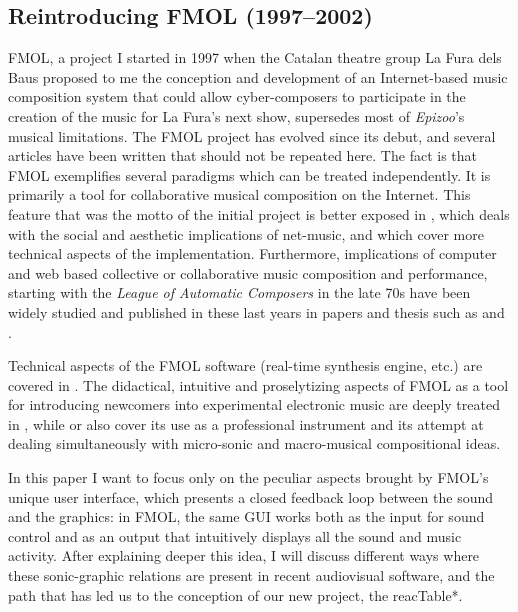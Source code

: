 \subsection{Reintroducing FMOL (1997--2002)}

FMOL, a project I started in 1997  when the Catalan theatre group La Fura dels
Baus proposed to me the conception and development of an Internet-based music 
composition  system that could allow cyber-composers to participate in the
creation of the music for La Fura's next show, supersedes most of \textit{Epizoo}'s
musical limitations. The FMOL project has  evolved since  its  debut, and 
several articles  have  been  written  that should not be repeated here. The fact
is that FMOL exemplifies several paradigms which can be treated independently. It
is primarily a tool for collaborative  musical composition  on the Internet. This
feature that was the motto of the initial project is better  exposed  in  \cite{Jorda:1999}, 
which  deals  with  the  social  and aesthetic implications of net-music, and
 \cite{Jorda:2001} which cover more technical aspects of the implementation. Furthermore,
implications of computer and web based collective or collaborative  music 
composition  and  performance,  starting with the \textit{League of Automatic Composers} in  the  late  70s  \cite{Bischoff:1978} have been widely studied and published  in these last
years in papers and thesis such as \cite{Barbosa:2002} and \cite{Follmer:2001}.

Technical aspects of the FMOL software (real-time synthesis engine, etc.) are
covered in \cite{Jorda:1998}. The didactical, intuitive and proselytizing aspects of FMOL as a
tool for introducing newcomers into experimental electronic music are deeply
treated in \cite{Jorda:2002}, while \cite{Jorda:2002a} or \cite{Jorda:2002b} also cover its use as a professional  
instrument   and   its    attempt    at    dealing simultaneously   with  
micro-sonic and    macro-musical compositional ideas.

In this paper I want to focus only on the peculiar aspects brought by FMOL's
unique user interface, which presents a closed feedback loop between the sound
and the graphics: in FMOL, the same GUI works both as the input for sound  control and as an output that intuitively displays  all  the  sound  and music activity. After explaining
deeper this idea, I will discuss different ways where these sonic-graphic
relations are present in recent audiovisual software, and the path that has led
us to the conception of our new project, the reacTable*.

